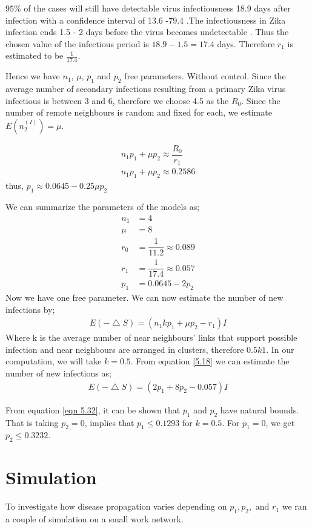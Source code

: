   $95\%$ of the cases will still have detectable virus infectiousness 18.9 days after infection with a confidence interval of 13.6 -79.4 \citep{lessler2016times}.The infectiousness in Zika infection ends 1.5 - 2 days before the virus becomes undetectable \citep{funk2016comparative}. Thus the chosen value of the infectious period is $18.9 - 1.5 = 17.4$ days. Therefore $r_1$ is estimated to be $\frac{1}{17.4}$.

Hence we have $n_1$, $\mu$, $p_1$ and $p_2$ free parameters. Without control. Since the average number of secondary infections resulting from a primary  Zika  virus infectious is between 3 and 6, therefore we choose 4.5 as the $R_0$. Since the number of remote neighbours is random and fixed for each, we estimate $E (n^ {(I)} _2) = \mu$.

\begin{align}
n_1 p_1 + \mu p_2 \approx \dfrac{R_0}{r_1} 
\\ n_1 p_1 + \mu p_2 \approx 0.2586 \label{eqn 5.32}
\end{align}
thus, 
$p_1 \approx   0.0645- 0.25 \mu p_2$

We can summarize the parameters of the models as;
\begin{align}
n_1 &= 4 \\
\mu &= 8 \\
r_0 &= \dfrac{1}{11.2} \approx 0.089 \\
r_1 &= \dfrac{1}{17.4} \approx 0.057 \\
p_1 &= 0.0645 - 2 p_2 \label{eqn 5.1.7}
\end{align}
Now we have one free parameter. We can now estimate the number of new infections by;
\begin{align}
E(- \bigtriangleup S) = (n_1 k p_1 + \mu p_2 - r_1) I \label{5.18}
\end{align}
Where k is the average number of near neighbours' links that support possible infection and near neighbours are arranged in clusters, therefore $0.5 k 1$.  In our computation, we will take $k = 0.5$. From equation \ref{5.18} we can estimate the number of new infections as;
\begin{align}
E(- \bigtriangleup S) = (2 p_1 + 8 p_2 - 0.057) I  \label{5.1.9}
\end{align}
 
From equation \ref{eqn 5.32}, it can be shown that $p_1$ and $p_2$ have natural bounds. That is taking $p_2 = 0$, implies that $p_1 \leq 0.1293$ for $k =0. 5$. For $p_1 = 0$, we get $p_2 \leq 0.3232$.
\section{Simulation}
To investigate how disease propagation varies depending on $p_1, p_2, $ and $r_1$ we ran a couple of simulation on a small work network.
 
